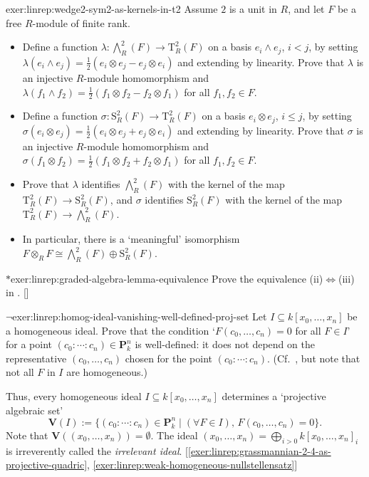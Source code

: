\begin{exer}{}{exer:linrep:wedge2-sym2-as-kernels-in-t2}
  Assume $2$ is a unit in $R$, and let $F$ be a free $R$-module of
  finite rank.
  \begin{itemize}
  \item Define a function
    $\lambda : \bigwedge^2_R(F) \to \mathrm{T}^2_R(F)$ on a basis
    $e_i \wedge e_j$, $i < j$, by setting
    $\lambda(e_i \wedge e_j) = \frac{1}{2}(e_i \otimes e_j - e_j
    \otimes e_i)$ and extending by linearity. Prove that $\lambda$ is
    an injective $R$-module homomorphism and
    $\lambda(f_1 \wedge f_2) = \frac{1}{2}(f_1 \otimes f_2 - f_2
    \otimes f_1)$ for all $f_1, f_2 \in F$.
  \item Define a function
    $\sigma : \mathrm{S}^2_R(F) \to \mathrm{T}^2_R(F)$ on a basis
    $e_i \otimes e_j$, $i \leq j$, by setting
    $\sigma(e_i \otimes e_j) = \frac{1}{2}(e_i \otimes e_j + e_j
    \otimes e_i)$ and extending by linearity. Prove that $\sigma$ is
    an injective $R$-module homomorphism and
    $\sigma(f_1 \otimes f_2) = \frac{1}{2}(f_1 \otimes f_2 + f_2
    \otimes f_1)$ for all $f_1, f_2 \in F$.
  \item Prove that $\lambda$ identifies $\bigwedge^2_R(F)$ with the
    kernel of the map $\mathrm{T}^2_R(F) \to \mathrm{S}^2_R(F)$, and
    $\sigma$ identifies $\mathrm{S}^2_R(F)$ with the kernel of the map
    $\mathrm{T}^2_R(F) \to \bigwedge^2_R(F)$.
  \item In particular, there is a `meaningful' isomorphism
    $F \otimes_R F \cong \bigwedge^2_R(F) \oplus \mathrm{S}^2_R(F)$.
  \end{itemize}
\end{exer}
\begin{exer}{$*$}{exer:linrep:graded-algebra-lemma-equivalence}
  Prove the equivalence (ii)$\iff$(iii) in
  . []
\end{exer}

\begin{exer}{$\lnot$}{exer:linrep:homog-ideal-vanishing-well-defined-proj-set}
  Let $I \subseteq k[x_0, \dots, x_n]$ be a homogeneous ideal. Prove
  that the condition `$F(c_0, \dots, c_n) = 0$ for all $F \in I$' for
  a point $(c_0 : \cdots : c_n) \in \mathbf{P}^n_k$ is well-defined:
  it does not depend on the representative $(c_0, \dots, c_n)$ chosen
  for the point $(c_0 : \cdots : c_n)$. (Cf.\
  , but note
  that not all $F$ in $I$ are homogeneous.)

  Thus, every homogeneous ideal $I \subseteq k[x_0, \dots, x_n]$
  determines a `projective algebraic set'
  \[
    \mathbf{V}(I) := \{(c_0 : \cdots : c_n) \in \mathbf{P}^n_k \mid
    (\forall F \in I),\, F(c_0, \dots, c_n) = 0\}.
  \]
  Note that $\mathbf{V}((x_0, \dots, x_n)) = \emptyset$. The ideal
  $(x_0, \dots, x_n) = \bigoplus_{i > 0} k[x_0, \dots, x_n]_i$ is
  irreverently called the \emph{irrelevant
    ideal}. [\ref{exer:linrep:grassmannian-2-4-as-projective-quadric},
  \ref{exer:linrep:weak-homogeneous-nullstellensatz}]
\end{exer}


